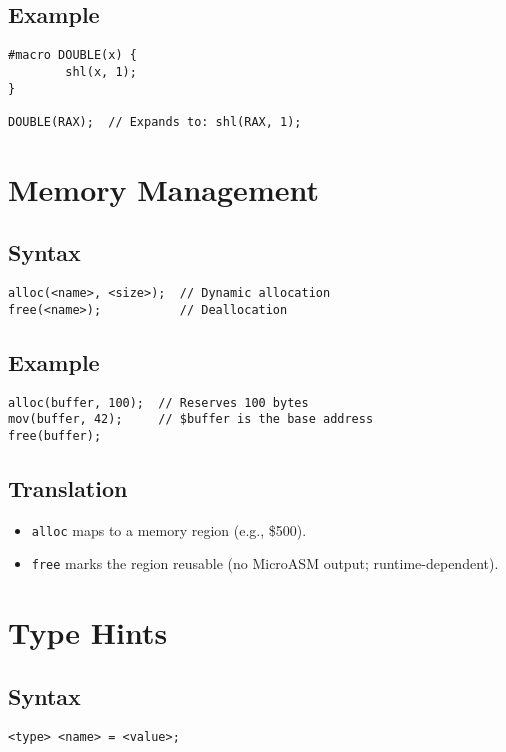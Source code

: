\documentclass[a4paper,11pt]{book}
\begin{document}
\subsection*{Example}
\begin{lstlisting}[language=Wake]
#macro DOUBLE(x) {
		shl(x, 1);
}

DOUBLE(RAX);  // Expands to: shl(RAX, 1);
\end{lstlisting}

\section{Memory Management}
\subsection*{Syntax}
\begin{lstlisting}[language=Wake]
alloc(<name>, <size>);  // Dynamic allocation
free(<name>);           // Deallocation
\end{lstlisting}

\subsection*{Example}
\begin{lstlisting}[language=Wake]
alloc(buffer, 100);  // Reserves 100 bytes
mov(buffer, 42);     // $buffer is the base address
free(buffer);
\end{lstlisting}

\subsection*{Translation}
\begin{itemize}
	\item \texttt{alloc} maps to a memory region (e.g., \$500).
	\item \texttt{free} marks the region reusable (no MicroASM output; runtime-dependent).
\end{itemize}

\section{Type Hints}
\subsection*{Syntax}
\begin{lstlisting}[language=Wake]
<type> <name> = <value>;
\end{lstlisting}
\end{document}
